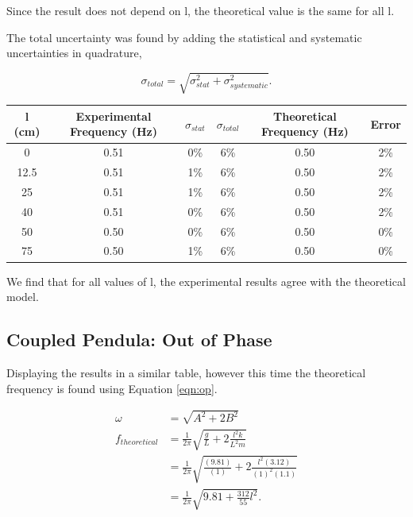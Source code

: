 \documentclass{article}
\begin{document}
Since the result does not depend on l, the theoretical value is the same for 
all l.

The total uncertainty was found by adding the statistical and systematic 
uncertainties in quadrature,

\begin{equation}
    \sigma_{total} = \sqrt{\sigma_{stat}^2+\sigma_{systematic}^2}.
\end{equation}

\begin{table} [H]
    \centering
    \begin{tabular} {c|c|c|c|c|c}
        l (cm) & Experimental Frequency (Hz) & $\sigma_{stat}$ & $\sigma_{total}$ & 
        Theoretical Frequency (Hz) & Error \\
        \hline
        0 & 0.51 & 0\% & 6\% & 0.50 & 2\% \\
        \hline 
        12.5 & 0.51 & 1\% & 6\% & 0.50 & 2\% \\
        \hline
        25 & 0.51 & 1\% & 6\% & 0.50 & 2\% \\
        \hline
        40 & 0.51 & 0\% & 6\% & 0.50 & 2\% \\
        \hline
        50 & 0.50 & 0\% & 6\% & 0.50 & 0\% \\
        \hline
        75 & 0.50 & 1\% & 6\% & 0.50 & 0\% 
    \end{tabular}
\end{table}

We find that for all values of l, the experimental results agree with the 
theoretical model.

\subsection{Coupled Pendula: Out of Phase}
Displaying the results in a similar table, however this time the theoretical 
frequency is found using Equation \ref{eqn:op}.

\begin{equation}
    \begin{split}
        \omega &= \sqrt{A^2+2B^2} \\
        f_{theoretical} &= \frac{1}{2\pi}\sqrt{\frac{g}{L}+2\frac{l^2k}{L^2m}} \\
        &= \frac{1}{2\pi}\sqrt{\frac{(9.81)}{(1)}+2\frac{l^2(3.12)}{(1)^2(1.1)}} \\
        &= \frac{1}{2\pi}\sqrt{9.81+\frac{312}{55}l^2}.
    \end{split}
\end{equation}
\end{document}
